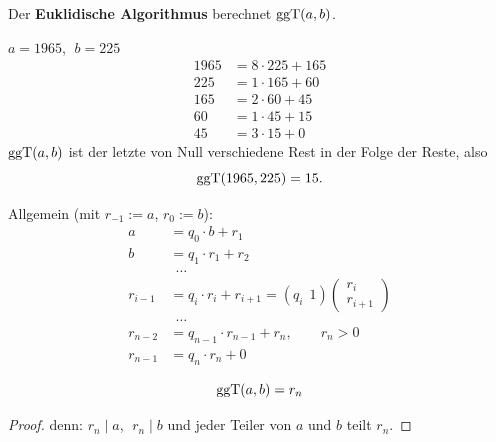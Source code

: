 \begin{algorithmus}
Der \textbf{Euklidische Algorithmus} berechnet $\operatorname{ggT}(a, b)$.
\end{algorithmus}

\begin{beispiel}
$a = 1965$, $\;b = 225$
\begin{align*}
1965 &= 8 \cdot 225 + 165 \\
225 &= 1 \cdot 165 + 60 \\
165 &= 2 \cdot 60 + 45 \\
60 &= 1 \cdot 45 + 15 \\
45 &= 3 \cdot 15 + 0
\end{align*}
$\operatorname{ggT}(a, b)$ ist der letzte von Null verschiedene Rest in der Folge der Reste, also
\[ \operatorname{ggT}(1965, 225) = 15. \]
\end{beispiel}

Allgemein (mit $r_{-1} := a$, $r_0 := b$):
\begin{align*}
a &= q_0 \cdot b + r_1 \\
b &= q_1 \cdot r_1 + r_2 \\
&\ \ \ldots \\
r_{i-1} &= q_i \cdot r_i + r_{i+1} = (q_i \ \ 1) \begin{pmatrix} r_i \\ r_{i+1} \end{pmatrix} \\
&\ \ \ldots \\
r_{n-2} &= q_{n-1} \cdot r_{n-1} + r_n, \qquad r_n > 0 \\
r_{n-1} &= q_n \cdot r_n + 0
\end{align*}

\begin{satz}[Euklid]
\[ \operatorname{ggT}(a, b) = r_n \]
\end{satz}

\begin{proof}
denn: $r_n \mid a$, $\;r_n \mid b$ und jeder Teiler von $a$ und $b$ teilt $r_n$.
\end{proof}

